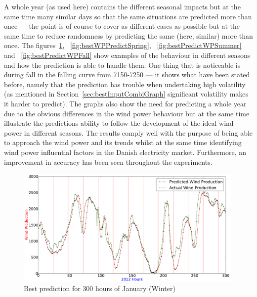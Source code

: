 A whole year (as used here) contains the different seasonal impacts but at the same time many similar days so that the same situations are predicted more than once --- the point is of course to cover as different cases as possible but at the same time to reduce randomness by predicting the same (here, similar) more than once. The figures~\ref{fig:bestWPPredictWinter}, ~\ref{fig:bestWPPredictSpring}, ~\ref{fig:bestPredictWPSummer} and ~\ref{fig:bestPredictWPFall} show examples of the behaviour in different seasons and how the prediction is able to handle them. One thing that is noticeable is during fall in the falling curve from 7150-7250 --- it shows what have been stated before, namely that the prediction has trouble when undertaking high volatility (as mentioned in Section~\ref{sec:bestInputCombiGraph} significant volatility makes it harder to predict). The graphs also show the need for predicting a whole year due to the obvious differences in the wind power behaviour but at the same time illustrate the predictions ability to follow the development of the ideal wind power in different seasons. The results comply well with the purpose of being able to approach the wind power and its trends whilst at the same time identifying wind power influential factors in the Danish electricity market. Furthermore, an improvement in accuracy has been seen throughout the experiments.

\begin{figure}[H]
\centering
\includegraphics[width=0.99\textwidth]{billeder/bestPossiblePredictionWindProduction0-300.png}
\caption{Best prediction for 300 hours of January (Winter)}
\label{fig:bestWPPredictWinter}
\end{figure}

